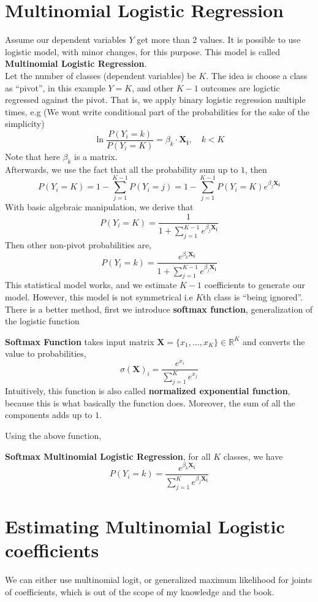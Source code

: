 \section{Multinomial Logistic Regression}
Assume our dependent variables $Y$ get more than 2 values. It is possible to use logistic model, with minor changes, for this purpose. This model is called \textbf{Multinomial Logistic Regression}.\\
Let the number of classes (dependent variables) be $K$. The idea is choose a class as ``pivot'', in this example $Y = K$, and other $K-1$ outcomes are logictic regressed against the pivot. That is, we apply binary logistic regression multiple times, e.g (We wont write conditional part of the probabilities for the sake of the simplicity)
\[ \ln \frac{P(Y_i = k)}{P(Y_i = K)} = \beta_k \cdot \mathbf{X_i}, \quad k < K\]
Note that here $\beta_k$ is a matrix. \\
Afterwards, we use the fact that all the probability sum up to $1$, then
\[ P(Y_i = K) = 1 - \sum_{j=1}^{K-1} P(Y_i = j) =1 - \sum_{j=1}^{K-1} P(Y_i = K)e^{\beta_j \mathbf{X_i}}\]
With basic algebraic manipulation, we derive that
\[ P(Y_i  = K) = \frac{1}{1 + \sum_{j=1}^{K-1} e^{\beta_j \mathbf{X_i}}}\]
Then other non-pivot probabilities are,
\[P(Y_i = k) = \frac{e^{\beta_k \mathbf{X_i}}}{1+ \sum_{j=1}^{K-1} e^{\beta_j\mathbf{X_i}}} \]
This statistical model works, and we estimate $K-1$ coefficients to generate our model. However, this model is not symmetrical i.e $K$th class is ``being ignored''. There is a better method, first we introduce \textbf{softmax function}, generalization of the logistic function
\begin{definition} \textbf{Softmax Function} takes input matrix $\mathbf{X} = \{x_1, \ldots, x_K\} \in \mathbb{R}^K$ and converts the value to probabilities,
    \[ \sigma(\mathbf{X})_i = \frac{e^{x_i}}{\sum_{j=1}^K e^{x_j}}\]
Intuitively, this function is also called \textbf{normalized exponential function}, because this is what basically the function does. Moreover, the sum of all the components adds up to $1$.
\end{definition}
Using the above function, 
\begin{definition}\textbf{Softmax Multinomial Logistic Regression}, for all $K$ classes, we have 
    \[ P(Y_i = k) = \frac { e^{\beta_k \mathbf{X_i}}}{\sum_{j=1}^K e^{\beta_j\mathbf{X_i}}}\]
\end{definition}
\section{Estimating Multinomial Logistic coefficients}
We can either use multinomial logit, or generalized maximum likelihood for joints of coefficients, which is out of the scope of my knowledge and the book.
